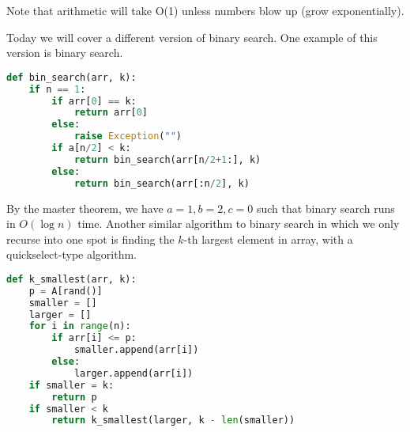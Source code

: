 
Note that arithmetic will take O(1) unless numbers blow up (grow exponentially).

Today we will cover a different version of binary search. One example of this version is binary search.

\begin{lstlisting}[language=Python]
def bin_search(arr, k):
	if n == 1:
		if arr[0] == k:
			return arr[0]
		else:
			raise Exception("")
		if a[n/2] < k:
			return bin_search(arr[n/2+1:], k)
		else:
			return bin_search(arr[:n/2], k)
\end{lstlisting}

By the master theorem, we have \( a=1, b=2, c=0 \) such that binary search runs in \( O(\log n) \) time. Another similar algorithm to binary search in which we only recurse into one spot is finding the \( k \)-th largest element in array, with a quickselect-type algorithm.

\begin{lstlisting}[language=Python]
def k_smallest(arr, k):
	p = A[rand()]
	smaller = []
	larger = []
	for i in range(n):
		if arr[i] <= p:
			smaller.append(arr[i])
		else:
			larger.append(arr[i])
	if smaller = k:
		return p
	if smaller < k
		return k_smallest(larger, k - len(smaller))
\end{lstlisting}
